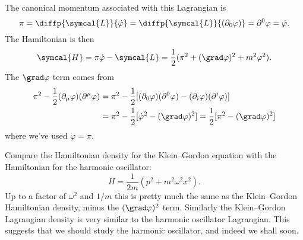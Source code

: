 \documentclass[fleqn]{NotesClass}
\newcommand{\lagrangianDensity}{\symcal{L}}
\newcommand{\hamiltonianDensity}{\symcal{H}}
\begin{document}
    The canonical momentum associated with this Lagrangian is
    \begin{equation}
        \pi = \diffp{\lagrangianDensity}{\dot{\varphi}} = \diffp{\lagrangianDensity}{(\partial_0 \varphi)}  = \partial^0 \varphi = \dot{\varphi}.
    \end{equation}
    The Hamiltonian is then
    \begin{equation}
        \hamiltonianDensity = \pi \dot{\varphi} - \lagrangianDensity = \frac{1}{2}(\pi^2 + (\grad \varphi)^2 + m^2\varphi^2).
    \end{equation}
    The \(\grad\varphi\) term comes from
    \begin{align}
        \pi^2 - \frac{1}{2} (\partial_\mu\varphi)(\partial^\mu\varphi) &= \pi^2 - \frac{1}{2} [(\partial_0 \varphi)(\partial^0 \varphi) - (\partial_i \varphi)(\partial^i \varphi)]\\
        &= \pi^2 - \frac{1}{2}[\dot{\varphi}^2 - (\grad\varphi)^2] = \frac{1}{2}[\pi^2 - (\grad\varphi)^2]
    \end{align}
    where we've used \(\dot{\varphi} = \pi\).
    
    Compare the Hamiltonian density for the Klein--Gordon equation with the Hamiltonian for the harmonic oscillator:
    \begin{equation}
        H = \frac{1}{2m} (p^2 + m^2\omega^2 x^2).
    \end{equation}
    Up to a factor of \(\omega^2\) and \(1/m\) this is pretty much the same as the Klein--Gordon Hamiltonian density, minus the \((\grad \varphi)^2\) term.
    Similarly the Klein--Gordon Lagrangian density is very similar to the harmonic oscillator Lagrangian.
    This suggests that we should study the harmonic oscillator, and indeed we shall soon.
    
\end{document}
